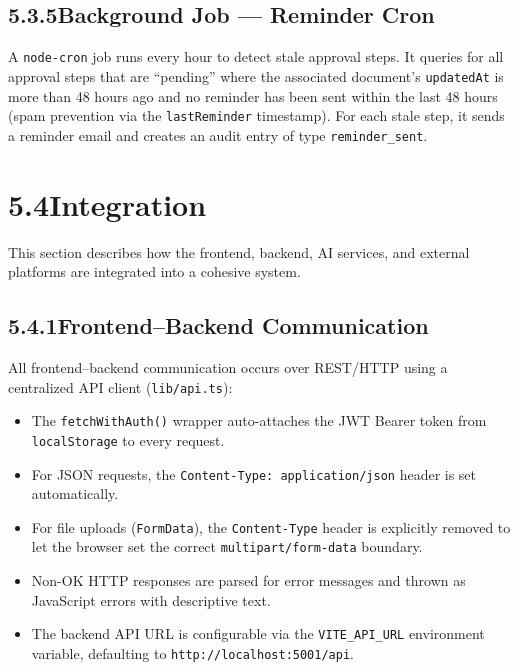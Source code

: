 \documentclass[12pt,a4paper]{report}
\newcommand{\citeref}[1]{%
  \textcolor{citeborder}{%
    \fboxsep=2pt%
    \fcolorbox{citeborder}{citebg}{\footnotesize\bfseries[#1]}%
  }%
}
\begin{document}
\subsection*{5.3.5\quad Background Job --- Reminder Cron}

A \texttt{node-cron} \citeref{7} job runs every hour to detect stale approval steps. It queries for all approval steps that are ``pending'' where the associated document's \texttt{updatedAt} is more than 48 hours ago and no reminder has been sent within the last 48 hours (spam prevention via the \texttt{lastReminder} timestamp). For each stale step, it sends a reminder email and creates an audit entry of type \texttt{reminder\_sent}.

\section*{5.4\quad Integration}

This section describes how the frontend, backend, AI services, and external platforms are integrated into a cohesive system.

\subsection*{5.4.1\quad Frontend--Backend Communication}

All frontend--backend communication occurs over REST/HTTP using a centralized API client (\texttt{lib/api.ts}):

\begin{itemize}
    \item The \texttt{fetchWithAuth()} wrapper auto-attaches the JWT Bearer token from \texttt{localStorage} to every request.
    \item For JSON requests, the \texttt{Content-Type: application/json} header is set automatically.
    \item For file uploads (\texttt{FormData}), the \texttt{Content-Type} header is explicitly removed to let the browser set the correct \texttt{multipart/form-data} boundary.
    \item Non-OK HTTP responses are parsed for error messages and thrown as JavaScript errors with descriptive text.
    \item The backend API URL is configurable via the \texttt{VITE\_API\_URL} environment variable, defaulting to \texttt{http://localhost:5001/api}.
\end{itemize}
\end{document}
